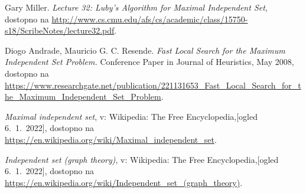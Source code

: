 \documentclass[a4paper, 12pt]{article}
\begin{document}
\begin{thebibliography}{9}    

    Gary Miller.
    \textit{Lecture 32: Luby’s Algorithm for Maximal Independent Set}, dostopno na \url{http://www.cs.cmu.edu/afs/cs/academic/class/15750-s18/ScribeNotes/lecture32.pdf}.

    Diogo Andrade, Mauricio G. C. Resende.
    \textit{Fast Local Search for the Maximum Independent Set Problem.} Conference Paper in Journal of Heuristics, May 2008, 
    dostopno na \url{https://www.researchgate.net/publication/221131653_Fast_Local_Search_for_the_Maximum_Independent_Set_Problem}.

    \textit{Maximal independent set}, v: Wikipedia: The Free Encyclopedia,[ogled 6.~1.~2022], dostopno na \url{https://en.wikipedia.org/wiki/Maximal_independent_set}.

    \textit{Independent set (graph theory)}, v: Wikipedia: The Free Encyclopedia,[ogled 6.~1.~2022], dostopno na \url{https://en.wikipedia.org/wiki/Independent_set_(graph_theory)}.

    
\end{thebibliography}
\end{document}
